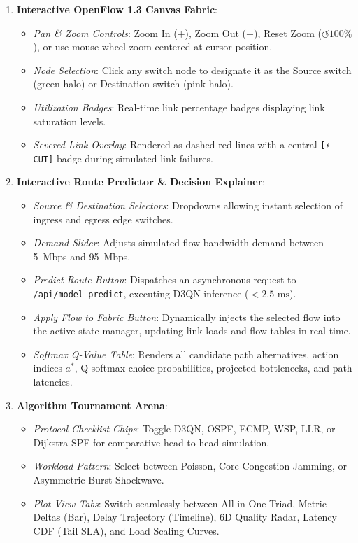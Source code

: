 \begin{enumerate}
    \item \textbf{Interactive OpenFlow 1.3 Canvas Fabric}:
    \begin{itemize}
        \item \textit{Pan \& Zoom Controls}: Zoom In ($+$), Zoom Out ($-$), Reset Zoom ($\circlearrowleft 100\%$), or use mouse wheel zoom centered at cursor position.
        \item \textit{Node Selection}: Click any switch node to designate it as the Source switch (green halo) or Destination switch (pink halo).
        \item \textit{Utilization Badges}: Real-time link percentage badges displaying link saturation levels.
        \item \textit{Severed Link Overlay}: Rendered as dashed red lines with a central \texttt{[⚡ CUT]} badge during simulated link failures.
    \end{itemize}
    
    \item \textbf{Interactive Route Predictor \& Decision Explainer}:
    \begin{itemize}
        \item \textit{Source \& Destination Selectors}: Dropdowns allowing instant selection of ingress and egress edge switches.
        \item \textit{Demand Slider}: Adjusts simulated flow bandwidth demand between 5~Mbps and 95~Mbps.
        \item \textit{Predict Route Button}: Dispatches an asynchronous request to \texttt{/api/model\_predict}, executing D3QN inference ($<2.5\text{ ms}$).
        \item \textit{Apply Flow to Fabric Button}: Dynamically injects the selected flow into the active state manager, updating link loads and flow tables in real-time.
        \item \textit{Softmax Q-Value Table}: Renders all candidate path alternatives, action indices $a^*$, Q-softmax choice probabilities, projected bottlenecks, and path latencies.
    \end{itemize}
    
    \item \textbf{Algorithm Tournament Arena}:
    \begin{itemize}
        \item \textit{Protocol Checklist Chips}: Toggle D3QN, OSPF, ECMP, WSP, LLR, or Dijkstra SPF for comparative head-to-head simulation.
        \item \textit{Workload Pattern}: Select between Poisson, Core Congestion Jamming, or Asymmetric Burst Shockwave.
        \item \textit{Plot View Tabs}: Switch seamlessly between All-in-One Triad, Metric Deltas (Bar), Delay Trajectory (Timeline), 6D Quality Radar, Latency CDF (Tail SLA), and Load Scaling Curves.
    \end{itemize}
    

\end{enumerate}
